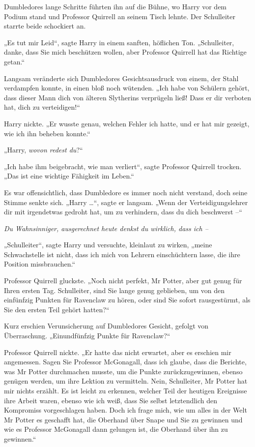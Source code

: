 {Dumbledores lange Schritte führten ihn auf die Bühne, wo Harry vor dem Podium stand und Professor Quirrell an seinem Tisch lehnte. Der Schulleiter starrte beide schockiert an.

„Es tut mir Leid“, sagte Harry in einem sanften, höflichen Ton. „Schulleiter, danke, dass Sie mich beschützen wollen, aber Professor Quirrell hat das Richtige getan.“

Langsam veränderte sich Dumbledores Gesichtsausdruck von einem, der Stahl verdampfen konnte, in einen bloß noch wütenden. „Ich habe von Schülern gehört, dass dieser Mann dich von älteren Slytherins verprügeln ließ! Dass er dir verboten hat, dich zu verteidigen!“

Harry nickte. „Er wusste genau, welchen Fehler ich hatte, und er hat mir gezeigt, wie ich ihn beheben konnte.“

„Harry, \emph{wovon redest du}?“

„Ich habe ihm beigebracht, wie man verliert“, sagte Professor Quirrell trocken. „Das ist eine wichtige Fähigkeit im Leben.“

Es war offensichtlich, dass Dumbledore es immer noch nicht verstand, doch seine Stimme senkte sich. „Harry …“, sagte er langsam. „Wenn der Verteidigungslehrer dir mit irgendetwas gedroht hat, um zu verhindern, dass du dich beschwerst --“

\emph{Du Wahnsinniger, ausgerechnet heute denkst du wirklich, dass ich --}

„Schulleiter“, sagte Harry und versuchte, kleinlaut zu wirken, „meine Schwachstelle ist nicht, dass ich mich von Lehrern einschüchtern lasse, die ihre Position missbrauchen.“

Professor Quirrell gluckste. „Noch nicht perfekt, Mr Potter, aber gut genug für Ihren ersten Tag. Schulleiter, sind Sie lange genug geblieben, um von den einfünfzig Punkten für Ravenclaw zu hören, oder sind Sie sofort rausgestürmt, als Sie den ersten Teil gehört hatten?“

Kurz erschien Verunsicherung auf Dumbledores Gesicht, gefolgt von Überraschung. „Einundfünfzig Punkte für Ravenclaw?“

Professor Quirrell nickte. „Er hatte das nicht erwartet, aber es erschien mir angemessen. Sagen Sie Professor McGonagall, dass ich glaube, dass die Berichte, was Mr Potter durchmachen musste, um die Punkte zurückzugewinnen, ebenso genügen werden, um ihre Lektion zu vermitteln. Nein, Schulleiter, Mr Potter hat mir nichts erzählt. Es ist leicht zu erkennen, welcher Teil der heutigen Ereignisse ihre Arbeit waren, ebenso wie ich weiß, dass Sie selbst letztendlich den Kompromiss vorgeschlagen haben. Doch ich frage mich, wie um alles in der Welt Mr Potter es geschafft hat, die Oberhand über Snape und Sie zu gewinnen und wie es Professor McGonagall dann gelungen ist, die Oberhand über ihn zu gewinnen.“

}

